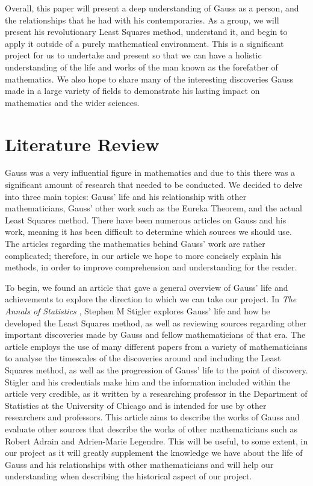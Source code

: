 \documentclass{article}
\begin{document}
Overall, this paper will present a deep understanding of Gauss as a person, and the relationships that he had with his contemporaries. As a group, we will present his revolutionary Least Squares method, understand it, and begin to apply it outside of a purely mathematical environment. This is a significant project for us to undertake and present so that we can have a holistic understanding of the life and works of the man known as the forefather of mathematics. We also hope to share many of the interesting discoveries Gauss made in a large variety of fields to demonstrate his lasting impact on mathematics and the wider sciences. 


\section{Literature Review}
Gauss was a very influential figure in mathematics and due to this there was a significant amount of research that needed to be conducted. We decided to delve into three main topics: Gauss' life and his relationship with other mathematicians, Gauss' other work such as the Eureka Theorem, and the actual Least Squares method. There have been numerous articles on Gauss and his work, meaning it has been difficult to determine which sources we should use. The articles regarding the mathematics behind Gauss' work are rather complicated; therefore, in our article we hope to more concisely explain his methods, in order to improve comprehension and understanding for the reader. 

To begin, we found an article that gave a general overview of Gauss' life and achievements to explore the direction to which we can take our project. In \textit{The Annals of Statistics} \cite{stigler}, Stephen M Stigler explores Gauss' life and how he developed the Least Squares method, as well as reviewing sources regarding other important discoveries made by Gauss and fellow mathematicians of that era. The article employs the use of many different papers from a variety of mathematicians to analyse the timescales of the discoveries around and including the Least Squares method, as well as the progression of Gauss' life to the point of discovery. Stigler and his credentials make him and the information included within the article very credible, as it written by a researching professor in the Department of Statistics at the University of Chicago and is intended for use by other researchers and professors. This article aims to describe the works of Gauss and evaluate other sources that describe the works of other mathematicians such as Robert Adrain and Adrien-Marie Legendre. This will be useful, to some extent, in our project as it will greatly supplement the knowledge we have about the life of Gauss and his relationships with other mathematicians and will help our understanding when describing the historical aspect of our project.
\end{document}
